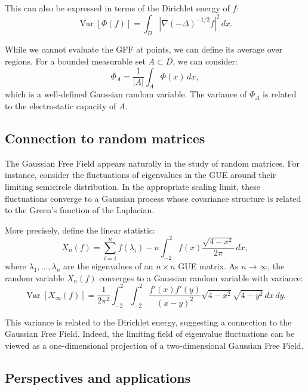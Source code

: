 \documentclass[letterpaper,11pt,oneside,reqno]{article}
\numberwithin{equation}{section}
\theoremstyle{definition}
\begin{document}
This can also be expressed in terms of the Dirichlet energy of $f$:
\begin{equation}
    \operatorname{Var}[\Phi(f)] = \int_D |\nabla (-\Delta)^{-1/2} f|^2 \, dx.
\end{equation}

While we cannot evaluate the GFF at points, we can define its average over regions. For a bounded measurable set $A \subset D$, we can consider:
\begin{equation}
    \Phi_A = \frac{1}{|A|} \int_A \Phi(x) \, dx,
\end{equation}
which is a well-defined Gaussian random variable. The variance of $\Phi_A$ is related to the electrostatic capacity of $A$.

\subsection{Connection to random matrices}

The Gaussian Free Field appears naturally in the study of random matrices. For instance, consider the fluctuations of eigenvalues in the GUE around their limiting semicircle distribution. In the appropriate scaling limit, these fluctuations converge to a Gaussian process whose covariance structure is related to the Green's function of the Laplacian.

More precisely, define the linear statistic:
\begin{equation}
    X_n(f) = \sum_{i=1}^n f(\lambda_i) - n \int_{-2}^{2} f(x) \frac{\sqrt{4 - x^2}}{2\pi} \, dx,
\end{equation}
where $\lambda_1, \ldots, \lambda_n$ are the eigenvalues of an $n \times n$ GUE matrix. As $n \to \infty$, the random variable $X_n(f)$ converges to a Gaussian random variable with variance:
\begin{equation}
    \operatorname{Var}[X_\infty(f)] = \frac{1}{2\pi^2} \int_{-2}^{2} \int_{-2}^{2} \frac{f'(x) f'(y)}{(x - y)^2} \sqrt{4 - x^2} \sqrt{4 - y^2} \, dx \, dy.
\end{equation}

This variance is related to the Dirichlet energy, suggesting a connection to the Gaussian Free Field. Indeed, the limiting field of eigenvalue fluctuations can be viewed as a one-dimensional projection of a two-dimensional Gaussian Free Field.

\subsection{Perspectives and applications}
\end{document}
